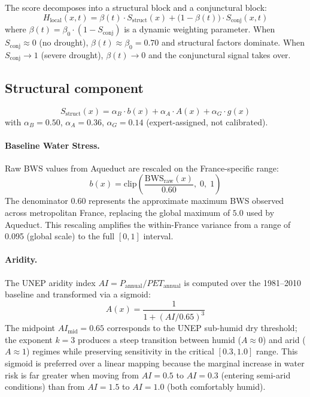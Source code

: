 \documentclass[11pt,a4paper]{article}
\begin{document}
The score decomposes into a structural block and a conjunctural block:
\begin{equation}
H_{\text{local}}(x,t) = \beta(t) \cdot S_{\text{struct}}(x) + \bigl(1 - \beta(t)\bigr) \cdot S_{\text{conj}}(x,t)
\label{eq:main}
\end{equation}
where $\beta(t) = \beta_0 \cdot (1 - S_{\text{conj}})$ is a dynamic weighting parameter. When $S_{\text{conj}} \approx 0$ (no drought), $\beta(t) \approx \beta_0 = 0.70$ and structural factors dominate. When $S_{\text{conj}} \to 1$ (severe drought), $\beta(t) \to 0$ and the conjunctural signal takes over.

\subsection{Structural component}

\begin{equation}
S_{\text{struct}}(x) = \alpha_B \cdot b(x) + \alpha_A \cdot A(x) + \alpha_G \cdot g(x)
\end{equation}
with $\alpha_B = 0.50$, $\alpha_A = 0.36$, $\alpha_G = 0.14$ (expert-assigned, not calibrated).

\paragraph{Baseline Water Stress.} Raw BWS values from Aqueduct are rescaled on the France-specific range:
\begin{equation}
b(x) = \text{clip}\!\left(\frac{\text{BWS}_{\text{raw}}(x)}{0.60},\; 0,\; 1\right)
\end{equation}
The denominator $0.60$ represents the approximate maximum BWS observed across metropolitan France, replacing the global maximum of $5.0$ used by Aqueduct. This rescaling amplifies the within-France variance from a range of 0.095 (global scale) to the full $[0,1]$ interval.

\paragraph{Aridity.} The UNEP aridity index $AI = P_{\text{annual}} / PET_{\text{annual}}$ is computed over the 1981--2010 baseline and transformed via a sigmoid:
\begin{equation}
A(x) = \frac{1}{1 + (AI / 0.65)^3}
\end{equation}
The midpoint $AI_{\text{mid}} = 0.65$ corresponds to the UNEP sub-humid dry threshold; the exponent $k=3$ produces a steep transition between humid ($A \approx 0$) and arid ($A \approx 1$) regimes while preserving sensitivity in the critical $[0.3, 1.0]$ range. This sigmoid is preferred over a linear mapping because the marginal increase in water risk is far greater when moving from $AI=0.5$ to $AI=0.3$ (entering semi-arid conditions) than from $AI=1.5$ to $AI=1.0$ (both comfortably humid).
\end{document}
